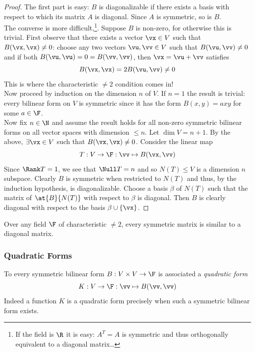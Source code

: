 \begin{proof}
The first part is easy: $B$ is diagonalizable if there exists a basis with respect to which its matrix $A$ is diagonal. Since $A$ is symmetric, so is $B$.\\[5pt]
The converse is more difficult,\footnote{If the field is $\R$ it is easy: $A^T=A$ is symmetric and thus orthogonally equivalent to a diagonal matrix\ldots}. Suppose $B$ is non-zero, for otherwise this is trivial. First observe that there exists a vector $\vx\in V$ such that $B(\vx,\vx)\neq 0$: choose any two vectors $\vu,\vv\in V$ such that $B(\vu,\vv)\neq 0$ and if both $B(\vu,\vu)=0=B(\vv,\vv)$, then $\vx=\vu+\vv$ satisfies
\[B(\vx,\vx)=2B(\vu,\vv)\neq 0\]
This is where the characteristic $\neq 2$ condition comes in!\\[5pt]
Now proceed by induction on the dimension $n$ of $V$. If $n=1$ the result is trivial: every bilinear form on $V$ is symmetric since it has the form $B(x,y)=axy$ for some $a\in\F$.\\
Now fix $n\in\N$ and assume the result holds for all non-zero symmetric bilinear forms on all vector spaces with dimension $\le n$. Let $\dim V=n+1$. By the above, $\exists \vx\in V$ such that $B(\vx,\vx)\neq 0$. Consider the linear map
\[T:V\to\F:\vv\mapsto B(\vx,\vv)\]
Since $\Rank T=1$, we see that $\Null T=n$ and so $N(T)\le V$ is a dimension $n$ subspace. Clearly $B$ is symmetric when restricted to $N(T)$ and thus, by the induction hypothesis, is diagonalizable. Choose a basis $\beta$ of $N(T)$ such that the matrix of $\at{B}{N(T)}$ with respect to $\beta$ is diagonal. Then $B$ is clearly diagonal with respect to the basis $\beta\cup\{\vx\}$. 
\end{proof}

\begin{cor}{}{}
Over any field $\F$ of characteristic $\neq 2$, every symmetric matrix is similar to a diagonal matrix.
\end{cor}

\subsubsection*{Quadratic Forms}


\begin{defn}{}{}
To every symmetric bilinear form $B:V\times V\to\F$ is associated a \emph{quadratic form}
\[K:V\to\F:\vv\mapsto B(\vv,\vv)\]
Indeed a function $K$ is a quadratic form precisely when such a symmetric bilinear form exists.
\end{defn}


